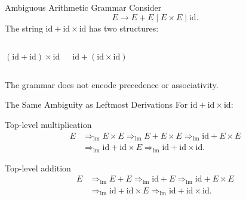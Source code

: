 \documentclass[10pt]{beamer}
\begin{document}
\begin{frame}{Ambiguous Arithmetic Grammar}
  Consider
  \[
    E\to E+E\mid E\times E\mid\mathrm{id}.
  \]
  The string $\mathrm{id}+\mathrm{id}\times\mathrm{id}$ has two structures:
  \begin{columns}[T]
    \centering $(\mathrm{id}+\mathrm{id})\times\mathrm{id}$

    \centering $\mathrm{id}+(\mathrm{id}\times\mathrm{id})$
  \end{columns}
  The grammar does not encode precedence or associativity.
\end{frame}

\begin{frame}{The Same Ambiguity as Leftmost Derivations}
  For $\mathrm{id}+\mathrm{id}\times\mathrm{id}$:
  \begin{block}{Top-level multiplication}
    \begin{align*}
      E&\Rightarrow_{\mathrm{lm}}E\times E
       \Rightarrow_{\mathrm{lm}}E+E\times E
       \Rightarrow_{\mathrm{lm}}\mathrm{id}+E\times E\\
       &\Rightarrow_{\mathrm{lm}}\mathrm{id}+\mathrm{id}\times E
       \Rightarrow_{\mathrm{lm}}\mathrm{id}+\mathrm{id}\times\mathrm{id}.
    \end{align*}
  \end{block}
  \begin{block}{Top-level addition}
    \begin{align*}
      E&\Rightarrow_{\mathrm{lm}}E+E
       \Rightarrow_{\mathrm{lm}}\mathrm{id}+E
       \Rightarrow_{\mathrm{lm}}\mathrm{id}+E\times E\\
       &\Rightarrow_{\mathrm{lm}}\mathrm{id}+\mathrm{id}\times E
       \Rightarrow_{\mathrm{lm}}\mathrm{id}+\mathrm{id}\times\mathrm{id}.
    \end{align*}
  \end{block}
\end{frame}
\end{document}

